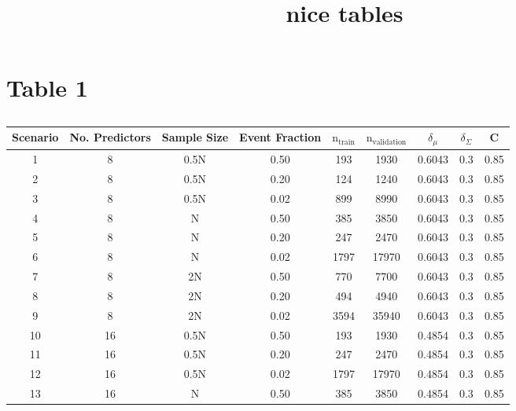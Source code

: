\documentclass[
]{article}
\title{nice tables}
\author{}
\date{\vspace{-2.5em}}
\begin{document}
\maketitle

\hypertarget{table-1}{%
\section{Table 1}\label{table-1}}

\begin{table}[!h]

\caption{\label{tab:tab:table} }
\centering
\begin{tabular}[t]{ccccccccc}
\toprule
Scenario & No. Predictors & Sample Size & Event Fraction & $\mathrm{n}_{\mathrm{train}}$ & $\mathrm{n}_{\mathrm{validation}}$ & $\delta_\mu$ & $\delta_\Sigma$ & C\\
\midrule
1 & 8 & 0.5N & 0.50 & 193 & 1930 & 0.6043 & 0.3 & 0.85\\
  
2 & 8 & 0.5N & 0.20 & 124 & 1240 & 0.6043 & 0.3 & 0.85\\
  
3 & 8 & 0.5N & 0.02 & 899 & 8990 & 0.6043 & 0.3 & 0.85\\
  
4 & 8 & N & 0.50 & 385 & 3850 & 0.6043 & 0.3 & 0.85\\
  
5 & 8 & N & 0.20 & 247 & 2470 & 0.6043 & 0.3 & 0.85\\
  
6 & 8 & N & 0.02 & 1797 & 17970 & 0.6043 & 0.3 & 0.85\\
  
7 & 8 & 2N & 0.50 & 770 & 7700 & 0.6043 & 0.3 & 0.85\\
  
8 & 8 & 2N & 0.20 & 494 & 4940 & 0.6043 & 0.3 & 0.85\\
  
9 & 8 & 2N & 0.02 & 3594 & 35940 & 0.6043 & 0.3 & 0.85\\
  
10 & 16 & 0.5N & 0.50 & 193 & 1930 & 0.4854 & 0.3 & 0.85\\
  
11 & 16 & 0.5N & 0.20 & 247 & 2470 & 0.4854 & 0.3 & 0.85\\
  
12 & 16 & 0.5N & 0.02 & 1797 & 17970 & 0.4854 & 0.3 & 0.85\\
  
13 & 16 & N & 0.50 & 385 & 3850 & 0.4854 & 0.3 & 0.85\\
  

\end{tabular}
\end{table}
\end{document}
